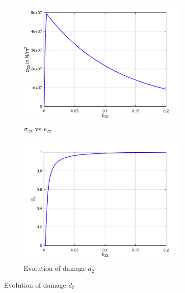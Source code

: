 \documentclass[12pt,a4paper,twoside,openright]{report}
\begin{document}
\FloatBarrier
\vspace*{1.8cm}
\begin{figure}[htbp!]\ContinuedFloat 
     \begin{subfigure}{0.4\textwidth}
         \includegraphics[width=8.5cm,height=6.5cm]{24.S22vsE22.png}
         \caption{$\sigma_{22}$ vs $\epsilon_{22}$}
         \label{fig:S22vsE22 2}
     \end{subfigure}   
     \hspace{1.5cm}
     \begin{subfigure}{0.4\textwidth}
         \centering
         \includegraphics[width=8.5cm,height=6.5cm]{24.d2.png}
         \caption{Evolution of damage $d_{2}$}
         \label{fig:Evolution of damage d2 2}
     \end{subfigure}
\end{figure}
\FloatBarrier
\end{document}
